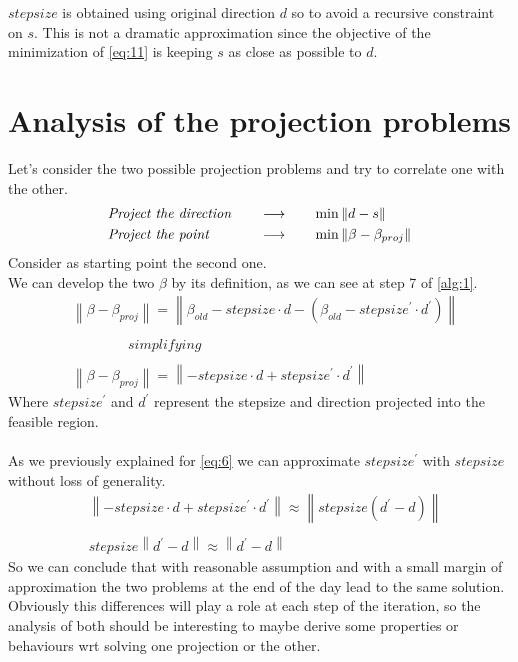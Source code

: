 \documentclass[12pt]{article}
\newcommand{\norm}[1]{\left\lVert#1\right\rVert}
\begin{document}
	$stepsize$ is obtained using original direction $d$ so to avoid a recursive constraint on $s$. This is not a dramatic approximation since the objective of the minimization of \eqref{eq:11} is keeping $s$ as close as possible to $d$.
	
	\section{Analysis of the projection problems}
        Let's consider the two possible projection problems and try to correlate one with the other.
        \begin{equation}
            \begin{aligned}
                &\emph{Project the direction}\quad &&\longrightarrow \quad &&\min \norm{d-s} \\
                &\emph{Project the point} &&\longrightarrow &&\min \norm{\beta-\beta_{proj}}\\
            \end{aligned}
        \end{equation}
        Consider as starting point the second one. \\
        We can develop the two $\beta$ by its definition, as we can see at step 7 of \ref{alg:1}.
        \begin{equation}
            \begin{aligned}
                &\norm{\beta-\beta_{proj}} = \norm{\beta_{old} - stepsize \cdot d - (\beta_{old} - stepsize^\prime \cdot d^\prime )}\\\\
                &\qquad \qquad simplifying\\\\
                &\norm{\beta-\beta_{proj}} = \norm{- stepsize \cdot d + stepsize^\prime \cdot d^\prime}
            \end{aligned}
        \end{equation}
        Where $stepsize^\prime$ and $d^\prime$ represent the stepsize and direction projected into the feasible region.\\\\
        As we previously explained for \eqref{eq:6} we can approximate $stepsize^\prime$ with $stepsize$ without loss of generality.
        \begin{equation}
            \begin{aligned}
                    &\norm{-stepsize \cdot d + stepsize^\prime \cdot d^\prime} \approx \norm{stepsize(d^\prime - d)} \\\\
                    &stepsize\norm{d^\prime - d} \approx \norm{d^\prime -d}
            \end{aligned}
        \end{equation}
        So we can conclude that with reasonable assumption and with a small margin of approximation the two problems at the end of the day lead to the same solution.\\
        Obviously this differences will play a role at each step of the iteration, so the analysis of both should be interesting to maybe derive some properties or behaviours wrt solving one projection or the other.
\end{document}
